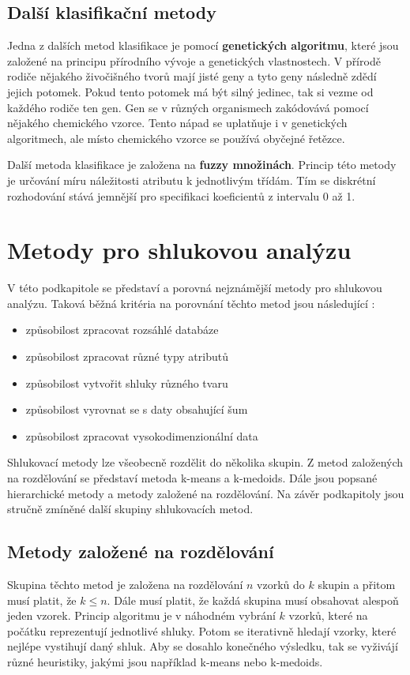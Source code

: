 \subsection*{Další klasifikační metody}
Jedna z dalších metod klasifikace je pomocí \textbf{genetických algoritmu}, které jsou založené na principu přírodního vývoje a genetických vlastnostech. V přírodě rodiče nějakého živočišného tvorů mají jisté geny a tyto geny následně zdědí jejich potomek. Pokud tento potomek má být silný jedinec, tak si vezme od každého rodiče ten  gen. Gen se v různých organismech zakódovává pomocí nějakého chemického vzorce. Tento nápad se uplatňuje i v genetických algoritmech, ale místo chemického vzorce se používá obyčejné řetězce. \cite{Han}

Další metoda klasifikace je založena na \textbf{fuzzy množinách}. Princip této metody je určování míru náležitosti atributu k jednotlivým třídám. Tím se diskrétní rozhodování stává jemnější pro specifikaci koeficientů z intervalu 0 až 1. \cite{Holecek}

\section{Metody pro shlukovou analýzu}

V této podkapitole se představí a porovná nejznámější metody pro shlukovou analýzu. Taková běžná kritéria na porovnání těchto metod jsou následující \cite{Han}:

\begin{itemize}
    \item způsobilost zpracovat rozsáhlé databáze
    \item způsobilost zpracovat různé typy atributů
    \item způsobilost vytvořit shluky různého tvaru
    \item způsobilost vyrovnat se s daty obsahující šum
    \item způsobilost zpracovat vysokodimenzionální data
\end{itemize}   

Shlukovací metody lze všeobecně rozdělit do několika skupin. Z metod založených na rozdělování se představí metoda k-means a k-medoids. Dále jsou popsané hierarchické metody a metody založené na rozdělování. Na závěr podkapitoly jsou stručně zmíněné další skupiny shlukovacích metod.

\subsection*{Metody založené na rozdělování}
Skupina těchto metod je založena na rozdělování $n$ vzorků do $k$ skupin a přitom musí platit, že $k \leq n$. Dále musí platit, že každá skupina musí obsahovat alespoň jeden vzorek. Princip algoritmu je v náhodném vybrání $k$ vzorků, které na počátku reprezentují jednotlivé shluky. Potom se iterativně hledají vzorky, které nejlépe vystihují daný shluk. Aby se dosahlo konečného výsledku, tak se vyživájí různé heuristiky, jakými jsou například k-means nebo k-medoids. \cite{Dunham}

